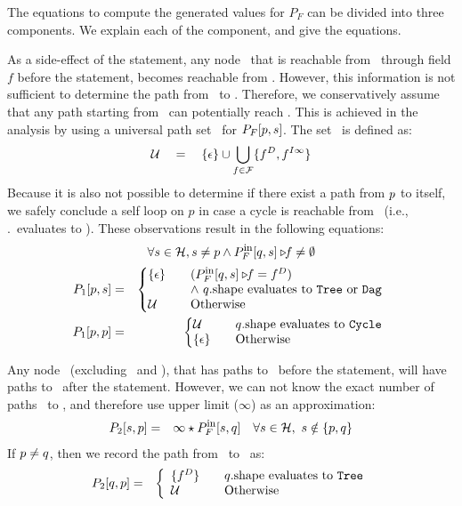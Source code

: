 The equations to compute the generated values for  $P_F$ 
can be divided into three components. We explain each of the
component, and give the equations.

As  a side-effect  of the  statement,  any node  \s\ that  is
reachable from  \q\ through  field $f$ before  the statement,
becomes reachable  from \p. However, this  information is not
sufficient to determine the  path from \p\ to \s.  Therefore,
we conservatively assume that  any path starting from \p\ can
potentially  reach \s. This  is achieved  in the  analysis by
using a universal path  set \upath\ for $P_F[p,s]$. The set
\upath\ is defined as:
\[ \mathcal{U} \quad=\quad \{\epsilon\} \cup \bigcup_{f\in\mathcal{F}}
\{f^{D},  f^{I\infty}\} \] 
%
Because it is also not possible to determine if there exist a
path from $p$  to itself, we safely conclude  a self loop on
$p$   in  case  a   cycle  is   reachable  from   \q\  (i.e.,
\q.\shape\ evaluates  to \Cycle).  These  observations result
in the following equations:
\[ \forall s \in \mathcal{H}, s \not=p \wedge
  P_F^{\mbox{\footnotesize in}}[q, s]\triangleright\!\!f \not= \emptyset \]
\begin{eqnarray*}
  P_1[\p, \s] &=&  \left\{\begin{array}{@{}ll}
    \epsilonset &\quad(\project{P_F^{\din}[\q, \s]}{f} =
    \fieldD{f}{}) \\ 
    & \quad \wedge\ \q.\shape \mbox{ evaluates to } \Tree
    \mbox{ or } \Dag \\
    \upath & \quad\mbox{Otherwise}
  \end{array}\right.
  \\
  P_1[\p, \p] &=& \left\{\begin{array}{@{}ll}
    \upath&\quad \q.\shape \mbox{ evaluates to } \Cycle \\
    \epsilonset &\quad \mbox{Otherwise}
  \end{array}\right.
\end{eqnarray*}


Any node \s\ (excluding \p\ and \q), that has paths to \q\ before the
statement,    will   have    paths   to    \p\    after   the
statement. However, we can not know the exact number of paths
\s\ to  \p, and  therefore use upper  limit ($\infty$)  as an
approximation:
\begin{eqnarray*}
  P_2[s, p] &=& \infty \star P_F^{\mbox{\footnotesize in}}[s, q] \quad
  \forall s \in \mathcal{H},\ s \notin \{p, q\} 
\end{eqnarray*}
If $p\not=q$, then we record the path from \q\ to \p\ as:
\begin{eqnarray*}
  P_2[q, p] &=& \left\{\begin{array}{ll}
  \{ f^{D} \}  &\quad q.\mbox{shape} \mbox{ evaluates to } {\tt Tree} \\
  \mathcal{U} &\quad \mbox{Otherwise}
  \end{array}\right.
\end{eqnarray*}



